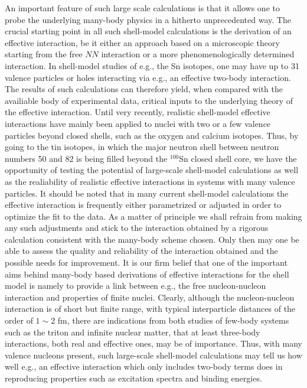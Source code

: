 An important feature of such large scale calculations
is that it allows one to probe the underlying many-body
physics in a hitherto unprecedented way.
The crucial starting point in all such shell-model 
calculations is
the derivation of an effective interaction, be it
either an approach based on a microscopic theory
starting from the free $NN$ interaction or a more 
phenomenologically determined interaction. 
In shell-model studies of e.g., the Sn isotopes, one may have
up to 31 valence particles or holes interacting via e.g.,
an effective two-body interaction. The results of such 
calculations can therefore yield, when compared with 
the availiable body of experimental data, critical
inputs to the underlying theory of the effective interaction.
Until very recently, realistic shell-model effective interactions have
mainly been applied to nuclei with two or a few valence particles beyond
closed shells, such as the oxygen and calcium isotopes. Thus, by going to the
tin isotopes, in which the major neutron shell between neutron numbers 50 and
82 is being filled beyond the $^{100}$Sn closed shell core, we have the opportunity
of testing the potential of large-scale 
shell-model calculations as well as the realiability of
realistic effective interactions in systems with many valence particles. It should
be noted that in many current shell-model calculations the effective interaction
is frequently either parametrized or adjusted in order to optimize the fit to the
data. As a matter of principle we shall refrain from making any such
adjustments and stick to the interaction obtained by a 
rigorous calculation consistent with the many-body scheme chosen. 
Only then may one 
be able to assess the quality and reliability of the interaction 
obtained and the possible
needs for improvement. 
It is our firm belief that 
one of the important  aims  
behind many-body based derivations of effective
interactions for the shell model is namely
to provide a link between e.g., the free
nucleon-nucleon interaction and properties of
finite nuclei. 
Clearly, although the nucleon-nucleon interaction is of short
but finite range, with typical interparticle
distances of the order of $1\sim 2$ fm, there are  
indications from both studies of few-body systems such as the triton and
infinite nuclear matter, that at least three-body
interactions, both real and effective ones, may be of
importance. 
Thus, with many valence nucleons present, such
large-scale shell-model calculations may
tell us how well e.g., an effective interaction
which only includes two-body terms does in
reproducing properties such as excitation spectra and
binding energies. 

